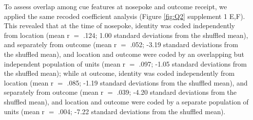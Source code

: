 \documentclass[11pt]{article}
\providecommand{\DIFadd}[1]{{\protect\color{red} \sf #1}} %
\begin{document}
\DIFadd{To assess  overlap among cue features at nosepoke and outcome receipt, we applied the same recoded coefficient analysis (Figure \ref{fig:Q2} supplement 1 E,F). This revealed that at the time of nosepoke, identity was coded independently from location (mean r  $=$ .124; 1.00 standard deviations from the shuffled mean), and separately from outcome (mean r  $=$ .052; -3.19 standard deviations from the shuffled mean), and location and outcome were coded by an overlapping but independent population of units (mean r  $=$ .097;  -1.05 standard deviations from the shuffled mean); while at outcome, identity was coded independently from location (mean r  $=$ .085; -1.19 standard deviations from the shuffled mean), and separately from outcome (mean r  $=$ .039;  -4.20 standard deviations from the shuffled mean), and location and outcome were coded by a separate population of units (mean r  $=$ .004;  -7.22 standard deviations from the shuffled mean). 
}
\end{document}
